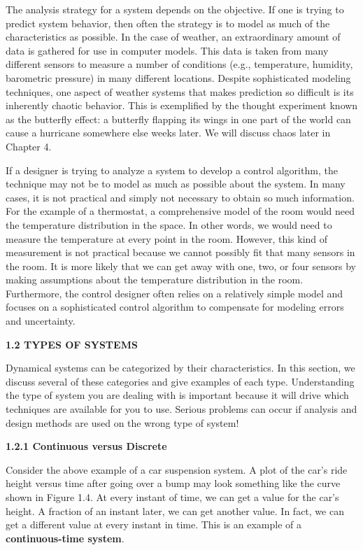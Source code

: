 \documentclass[12pt]{article}
\begin{document}
The analysis strategy for a system depends on the objective. If one is
trying to predict system behavior, then often the strategy is to model as
much of the characteristics as possible. In the case of weather, an
extraordinary amount of data is gathered for use in computer models. This
data is taken from many different sensors to measure a number of conditions
(e.g., temperature, humidity, barometric pressure) in many different
locations. Despite sophisticated modeling techniques, one aspect of weather
systems that makes prediction so difficult is its inherently chaotic behavior.
This is exemplified by the thought experiment known as the butterfly
effect: a butterfly flapping its wings in one part of the world can cause a
hurricane somewhere else weeks later. We will discuss chaos later in
Chapter 4.

If a designer is trying to analyze a system to develop a control algorithm,
the technique may not be to model as much as possible about the system. In
many cases, it is not practical and simply not necessary to obtain so much
information. For the example of a thermostat, a comprehensive model of
the room would need the temperature distribution in the space. In other
words, we would need to measure the temperature at every point in the
room. However, this kind of measurement is not practical because we
cannot possibly fit that many sensors in the room. It is more likely that we
can get away with one, two, or four sensors by making assumptions about
the temperature distribution in the room. Furthermore, the control
designer often relies on a relatively simple model and focuses on a sophisticated
control algorithm to compensate for modeling errors and
uncertainty.

\hfill

\textbf{1.2 TYPES OF SYSTEMS}

\hfill

Dynamical systems can be categorized by their characteristics. In this section,
we discuss several of these categories and give examples of each type.
Understanding the type of system you are dealing with is important because
it will drive which techniques are available for you to use. Serious problems
can occur if analysis and design methods are used on the wrong type of
system!

\hfill

\textbf{1.2.1 Continuous versus Discrete}

\hfill


Consider the above example of a car suspension system. A plot of the car’s
ride height versus time after going over a bump may look something like
the curve shown in Figure 1.4. At every instant of time, we can get a value
for the car’s height. A fraction of an instant later, we can get another value.
In fact, we can get a different value at every instant in time. This is an
example of a \textbf{continuous-time system}.
\end{document}
